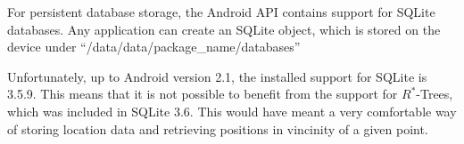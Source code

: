 For persistent database storage, the Android API contains
support for SQLite databases. Any application can create
an SQLite object, which is stored on the device under
``/data/data/package\_name/databases''

Unfortunately, up to Android version 2.1, the installed
support for SQLite is 3.5.9. This means that it is not
possible to benefit from the support for $R^*$-Trees,
which was included in SQLite 3.6. This would have meant
a very comfortable way of storing location data and
retrieving positions in vincinity of a given point.
